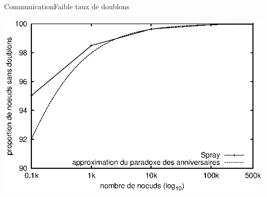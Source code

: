 




\begin{frame}{Communication}{Faible taux de doublons}
  \begin{center}
    \includegraphics[width=1\textwidth]{img/network/duplicates.eps}
  \end{center}
\end{frame}


